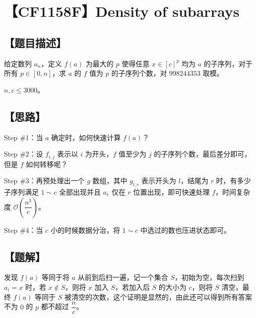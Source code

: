 \documentclass[UTF8,12pt,a4paper]{ctexart} %
\begin{document}
	\fontsize{12pt}{12pt}\selectfont
	
	\newpage
	\pagestyle{fancy}
	
	\section*{【CF1158F】Density of subarrays}
	
	\subsection*{【题目描述】}
	
	给定数列 $a_n$，定义 $f(a)$ 为最大的 $p$ 使得任意 $x\in[c]^{p}$ 均为 $a$ 的子序列，对于所有 $p\in[0,n]$，求 $a$ 的 $f$ 值为 $p$ 的子序列个数，对 $998244353$ 取模。
	
	$n,c\le3000$。
	
	\subsection*{【思路】}
	
	Step \#1：当 $a$ 确定时，如何快速计算 $f(a)$？
	
	Step \#2：设 $f_{i,j}$ 表示以 $i$ 为开头，$f$ 值至少为 $j$ 的子序列个数，最后差分即可，但是 $f$ 如何转移呢？
	
	Step \#3：再预处理出一个 $g$ 数组，其中 $g_{l,r}$ 表示开头为 $l$，结尾为 $r$ 时，有多少子序列满足 $1\sim c$ 全部出现并且 $a_r$ 仅在 $r$ 位置出现，即可快速处理 $f$，时间复杂度 $\mathcal{O}(\dfrac{n^3}{c})$。
	
	Step \#4：当 $c$ 小的时候数据分治，将 $1\sim c$ 中选过的数也压进状态即可。
	
	\subsection*{【题解】}
	
	发现 $f(a)$ 等同于将 $a$ 从前到后扫一遍，记一个集合 $S$，初始为空，每次扫到 $a_i=x$ 时，若 $x\not\in S$，则将 $x$ 加入 $S$，若加入后 $S$ 的大小为 $c$，则将 $S$ 清空，最终 $f(a)$ 等同于 $S$ 被清空的次数，这个证明是显然的，由此还可以得到所有答案不为 $0$ 的 $p$ 都不超过 $\dfrac{n}{c}$。
	
\end{document}
